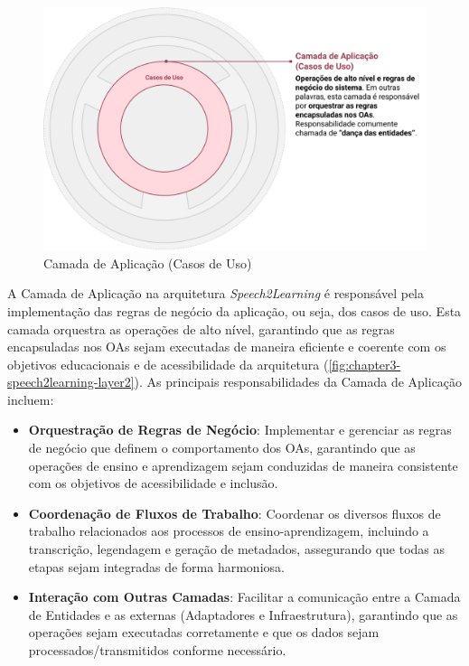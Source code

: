 \begin{figure}[htb]
\centering
\caption{Camada de Aplicação (Casos de Uso)}
\label{fig:chapter3-speech2learning-layer2}
\includegraphics[width=.98\textwidth]{images/chapter3-speech2learning-layer2.png}
\end{figure}

A Camada de Aplicação na arquitetura \textit{Speech2Learning} é responsável pela implementação das regras de negócio da aplicação, ou seja, dos casos de uso. Esta camada orquestra as operações de alto nível, garantindo que as regras encapsuladas nos OAs sejam executadas de maneira eficiente e coerente com os objetivos educacionais e de acessibilidade da arquitetura (\autoref{fig:chapter3-speech2learning-layer2}). As principais responsabilidades da Camada de Aplicação incluem:

\begin{itemize}
    \item \textbf{Orquestração de Regras de Negócio}: Implementar e gerenciar as regras de negócio que definem o comportamento dos OAs, garantindo que as operações de ensino e aprendizagem sejam conduzidas de maneira consistente com os objetivos de acessibilidade e inclusão.

    \item \textbf{Coordenação de Fluxos de Trabalho}: Coordenar os diversos fluxos de trabalho relacionados aos processos de ensino-aprendizagem, incluindo a transcrição, legendagem e geração de metadados, assegurando que todas as etapas sejam integradas de forma harmoniosa.

    \item \textbf{Interação com Outras Camadas}: Facilitar a comunicação entre a Camada de Entidades e as externas (Adaptadores e Infraestrutura), garantindo que as operações sejam executadas corretamente e que os dados sejam processados/transmitidos conforme necessário.
\end{itemize}

